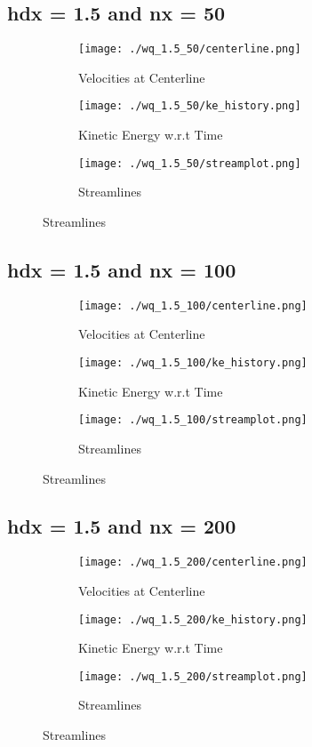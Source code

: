 \documentclass[12pt, a4paper]{report}
\begin{document}
\subsection{hdx = 1.5 and nx = 50}
\begin{figure}[H]
\begin{subfigure}{0.5\textwidth}
	\texttt{[image: ./wq\_1.5\_50/centerline.png]}
	\caption{Velocities at Centerline}
\end{subfigure}
\begin{subfigure}{0.5\textwidth}
	\texttt{[image: ./wq\_1.5\_50/ke\_history.png]}
	\caption{Kinetic Energy w.r.t Time}
\end{subfigure}
\medskip
\begin{subfigure}{\textwidth}
	\centering
	\texttt{[image: ./wq\_1.5\_50/streamplot.png]}
	\caption{Streamlines}
\end{subfigure}
\end{figure}

\subsection{hdx = 1.5 and nx = 100}
\begin{figure}[H]
\begin{subfigure}{0.5\textwidth}
	\texttt{[image: ./wq\_1.5\_100/centerline.png]}
	\caption{Velocities at Centerline}
\end{subfigure}
\begin{subfigure}{0.5\textwidth}
	\texttt{[image: ./wq\_1.5\_100/ke\_history.png]}
	\caption{Kinetic Energy w.r.t Time}
\end{subfigure}
\medskip
\begin{subfigure}{\textwidth}
	\texttt{[image: ./wq\_1.5\_100/streamplot.png]}
	\caption{Streamlines}
\end{subfigure}
\end{figure}

\subsection{hdx = 1.5 and nx = 200}
\begin{figure}[H]
\begin{subfigure}{0.5\textwidth}
	\texttt{[image: ./wq\_1.5\_200/centerline.png]}
	\caption{Velocities at Centerline}
\end{subfigure}
\begin{subfigure}{0.5\textwidth}
	\texttt{[image: ./wq\_1.5\_200/ke\_history.png]}
	\caption{Kinetic Energy w.r.t Time}
\end{subfigure}
\medskip
\begin{subfigure}{\textwidth}
	\texttt{[image: ./wq\_1.5\_200/streamplot.png]}
	\caption{Streamlines}
\end{subfigure}
\end{figure}
\end{document}
